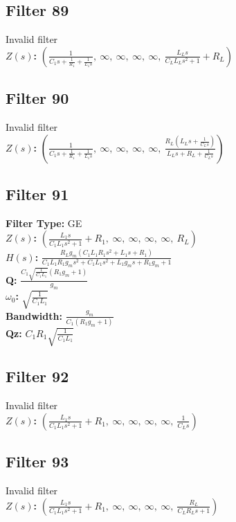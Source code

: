 \documentclass{article}
\begin{document}
\subsection*{Filter 89}
Invalid filter \\ 
\textbf{$Z(s)$:} $\left( \frac{1}{C_{1} s + \frac{1}{R_{1}} + \frac{1}{L_{1} s}}, \  \infty, \  \infty, \  \infty, \  \infty, \  \frac{L_{L} s}{C_{L} L_{L} s^{2} + 1} + R_{L}\right)$ \\ 
\subsection*{Filter 90}
Invalid filter \\ 
\textbf{$Z(s)$:} $\left( \frac{1}{C_{1} s + \frac{1}{R_{1}} + \frac{1}{L_{1} s}}, \  \infty, \  \infty, \  \infty, \  \infty, \  \frac{R_{L} \left(L_{L} s + \frac{1}{C_{L} s}\right)}{L_{L} s + R_{L} + \frac{1}{C_{L} s}}\right)$ \\ 
\subsection*{Filter 91}
\textbf{Filter Type:} GE \\ 
\textbf{$Z(s)$:} $\left( \frac{L_{1} s}{C_{1} L_{1} s^{2} + 1} + R_{1}, \  \infty, \  \infty, \  \infty, \  \infty, \  R_{L}\right)$ \\ 
\textbf{$H(s)$:} $\frac{R_{L} g_{m} \left(C_{1} L_{1} R_{1} s^{2} + L_{1} s + R_{1}\right)}{C_{1} L_{1} R_{1} g_{m} s^{2} + C_{1} L_{1} s^{2} + L_{1} g_{m} s + R_{1} g_{m} + 1}$ \\ 
\textbf{Q:} $\frac{C_{1} \sqrt{\frac{1}{C_{1} L_{1}}} \left(R_{1} g_{m} + 1\right)}{g_{m}}$ \\ 
\textbf{$\omega_0$:} $\sqrt{\frac{1}{C_{1} L_{1}}}$ \\ 
\textbf{Bandwidth:} $\frac{g_{m}}{C_{1} \left(R_{1} g_{m} + 1\right)}$ \\ 
\textbf{Qz:} $C_{1} R_{1} \sqrt{\frac{1}{C_{1} L_{1}}}$ \\ 
\subsection*{Filter 92}
Invalid filter \\ 
\textbf{$Z(s)$:} $\left( \frac{L_{1} s}{C_{1} L_{1} s^{2} + 1} + R_{1}, \  \infty, \  \infty, \  \infty, \  \infty, \  \frac{1}{C_{L} s}\right)$ \\ 
\subsection*{Filter 93}
Invalid filter \\ 
\textbf{$Z(s)$:} $\left( \frac{L_{1} s}{C_{1} L_{1} s^{2} + 1} + R_{1}, \  \infty, \  \infty, \  \infty, \  \infty, \  \frac{R_{L}}{C_{L} R_{L} s + 1}\right)$ \\ 
\end{document}
